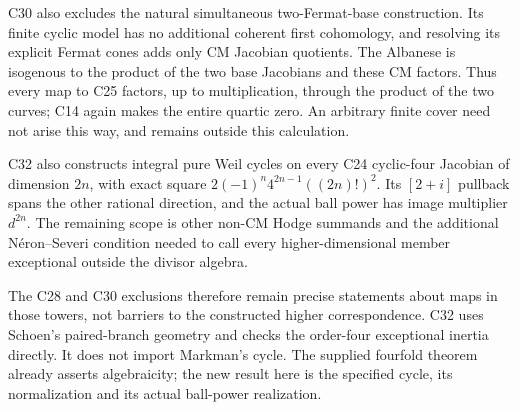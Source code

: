 \documentclass[11pt]{article}
\theoremstyle{definition}\newtheorem{definition}[theorem]{Definition}\newtheorem{remark}[theorem]{Remark}
\begin{document}
C30 also excludes the natural simultaneous two-Fermat-base
construction. Its finite cyclic model has no additional
coherent first cohomology, and resolving its explicit Fermat
cones adds only CM Jacobian quotients. The Albanese is
isogenous to the product of the two base Jacobians and these
CM factors. Thus every map to C25 factors, up to multiplication,
through the product of the two curves; C14 again makes the
entire quartic zero. An arbitrary finite cover need not arise
this way, and remains outside this calculation.

C32 also constructs integral pure Weil cycles on every C24
cyclic-four Jacobian of dimension $2n$, with exact square
$2(-1)^n4^{2n-1}((2n)!)^2$. Its $[2+i]$ pullback spans
the other rational direction, and the actual ball power has
image multiplier $d^{2n}$. The remaining scope is other
non-CM Hodge summands and the additional N\'eron--Severi
condition needed to call every higher-dimensional member
exceptional outside the divisor algebra.

The C28 and C30 exclusions therefore remain precise statements
about maps in those towers, not barriers to the constructed
higher correspondence. C32 uses Schoen's paired-branch geometry
and checks the order-four exceptional inertia directly. It
does not import Markman's cycle. The supplied fourfold theorem
already asserts algebraicity; the new result here is the
specified cycle, its normalization and its actual ball-power
realization.
\end{document}
